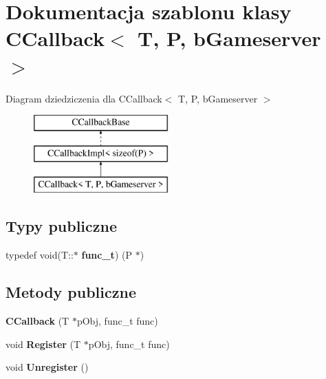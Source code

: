 \hypertarget{class_c_callback}{}\section{Dokumentacja szablonu klasy C\+Callback$<$ T, P, b\+Gameserver $>$}
\label{class_c_callback}
Diagram dziedziczenia dla C\+Callback$<$ T, P, b\+Gameserver $>$\begin{figure}[H]
\begin{center}
\leavevmode
\includegraphics[height=3.000000cm]{class_c_callback}
\end{center}
\end{figure}
\subsection*{Typy publiczne}
\begin{DoxyCompactItemize}
\item 
\mbox{\label{class_c_callback_a7688e1f370fac7a1ba294ab44a1509b0}} 
typedef void(T\+::$\ast$ {\bfseries func\+\_\+t}) (P $\ast$)
\end{DoxyCompactItemize}
\subsection*{Metody publiczne}
\begin{DoxyCompactItemize}
\item 
\mbox{\label{class_c_callback_a0ca8024dde6992e64e779c6027592e31}} 
{\bfseries C\+Callback} (T $\ast$p\+Obj, func\+\_\+t func)
\item 
\mbox{\label{class_c_callback_aae4ac76a691a5f0bf9801052d4e569cc}} 
void {\bfseries Register} (T $\ast$p\+Obj, func\+\_\+t func)
\item 
\mbox{\label{class_c_callback_a1d6de9c8b3d8d52ad3181ccb63b84872}} 
void {\bfseries Unregister} ()
\end{DoxyCompactItemize}
